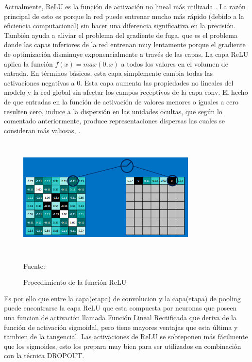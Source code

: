 		Actualmente, ReLU es la función de activación no lineal más utilizada \citep{cs231n}. La razón principal de esto es porque la red puede entrenar mucho más rápido (debido a la eficiencia computacional) sin hacer una diferencia significativa en la precisión. También ayuda a aliviar el problema del gradiente de fuga, que es el problema donde las capas inferiores de la red entrenan muy lentamente porque el gradiente de optimización	disminuye exponencialmente a través de las capas. La capa ReLU aplica la función ${f(x)} = {max (0, x)} $ a todos los valores en el volumen de entrada. En términos básicos, esta capa simplemente cambia todas las activaciones negativas a 0. Esta capa aumenta las propiedades no lineales del modelo y la red global sin afectar los campos receptivos de la capa conv. El hecho de que entradas en la función de activación de valores menores o iguales a cero resulten cero, induce a la dispersión en las unidades ocultas, que según lo comentado anteriormente, produce representaciones dispersas las cuales se consideran más valiosas, \citep{RELU}. 
		
		\begin{figure}[H]
		\begin{center}
		\includegraphics[width=0.8\textwidth, height=6cm]{images/marcoteorico/relu}
		\end{center}
		\begin{center}
		\caption{\small{Procedimiento de la función ReLU}}
		\vskip -0.2cm  
		{\small{Fuente: \cite{Rohrer}}}
		\end{center}
		\vspace{-1.5em}
		\end{figure}
		\vskip 0.4cm
		
		Es por ello que entre la capa(etapa) de convolucion y la capa(etapa) de pooling puede encontrarse la capa ReLU que esta compuesta por neuronas que poseen una funcion de activación llamada Función Lineal Rectificada que deriva de la función de activación sigmoidal, pero tiene mayores ventajas que esta última y tambien de la tangencial. Las activaciones de ReLU se sobreponen más fácilmente que los sigmoides, esto los prepara muy bien para ser utilizados en combinación con la técnica DROPOUT.
		
